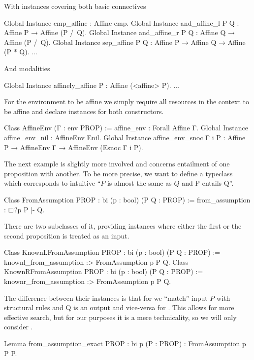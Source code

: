 With instances covering both basic connectives
\begin{coq}
Global Instance emp_affine : Affine emp.
Global Instance and_affine_l P Q : Affine P → Affine (P /\ Q).
Global Instance and_affine_r P Q : Affine Q → Affine (P /\ Q).
Global Instance sep_affine P Q : Affine P → Affine Q → Affine (P * Q).
$\ldots$
\end{coq}

And modalities
\begin{coq}
Global Instance affinely_affine P : Affine (<affine> P).
$\ldots$
\end{coq}

For the environment to be affine we simply require all resources in the context to be affine and declare instances for both constructors.
\begin{coq}
Class AffineEnv (Γ : env PROP) := affine_env : Forall Affine Γ.
Global Instance affine_env_nil : AffineEnv Enil.
Global Instance affine_env_snoc Γ i P :
  Affine P → AffineEnv Γ → AffineEnv (Esnoc Γ i P).
\end{coq}

The next example is slightly more involved and concerns entailment of one proposition with another.
To be more precise, we want to define a typeclass which corresponds to intuitive ``\(P\) is almost the same as \(Q\) and P entails Q''.
\begin{coq}
Class FromAssumption {PROP : bi} (p : bool) (P Q : PROP) :=
  from_assumption : $\mathop{\Box}$?p P |- Q.
\end{coq}

There are two subclasses of it, providing instances where either the first or the second proposition is treated as an input.
\begin{coq}
Class KnownLFromAssumption {PROP : bi} (p : bool) (P Q : PROP) :=
  knownl_from_assumption :> FromAssumption p P Q.
Class KnownRFromAssumption {PROP : bi} (p : bool) (P Q : PROP) :=
  knownr_from_assumption :> FromAssumption p P Q.
\end{coq}

The difference between their instances is that for  we ``match'' input \(P\) with structural rules and Q is an output and vice-versa for .
This allows for more effective search, but for our purposes it is a mere technicality, so we will only consider .

\begin{coq}
Lemma from_assumption_exact {PROP : bi} p (P : PROP) : FromAssumption p P P.
\end{coq}

